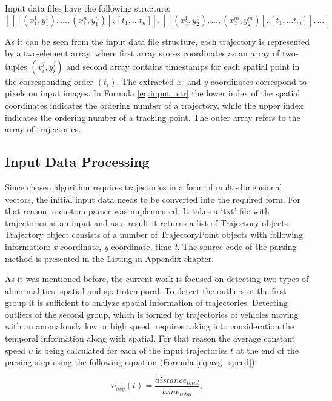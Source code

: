 Input data files have the following structure:
\begin{equation} \label{eq:input_str}
	[[[(x_1^1, y_1^1), ..., (x_1^n, y_1^n)], [t_1, ... t_n]], [[(x_2^1, y_2^1), ..., (x_2^m, y_2^m)], [t_1, ... t_m]], ...]
\end{equation}

As it can be seen from the input data file structure, each trajectory is represented by a two-element array, where first array stores coordinates as an array of two-tuples $(x_i^j, y_i^j)$ and second array contains timestamps for each spatial point in the corresponding order $(t_i)$. The extracted $x$- and $y$-coordinates correspond to pixels on input images. In Formula \ref{eq:input_str} the lower index of the spatial coordinates indicates the ordering number of a trajectory, while the upper index indicates the ordering number of a tracking point. The outer array refers to the array of trajectories.

\subsection{Input Data Processing}
Since chosen algorithm requires trajectories in a form of multi-dimensional vectors, the initial input data needs to be converted into the required form. For that reason, a custom parser was implemented. It takes a ‘txt’ file with trajectories as an input and as a result it returns a list of Trajectory objects. Trajectory object consists of a number of TrajectoryPoint objects with following information: \textit{x}-coordinate, \textit{y}-coordinate, time \textit{t}. The source code of the parsing method is presented in the Listing in Appendix chapter.

As it was mentioned before, the current work is focused on detecting two types of abnormalities: spatial and spatiotemporal. To detect the outliers of the first group it is sufficient to analyze spatial information of trajectories. Detecting outliers of the second group, which is formed by trajectories of vehicles moving with an anomalously low or high speed, requires taking into consideration the temporal information along with spatial. For that reason the average constant speed $\upsilon$ is being calculated for each of the input trajectories $t$ at the end of the parsing step using the following equation (Formula \ref{eq:avg_speed}):

\begin{equation} \label{eq:avg_speed}
\upsilon_{avg}(t) = \frac{distance_{total}} {time_{total}},
\end{equation}

